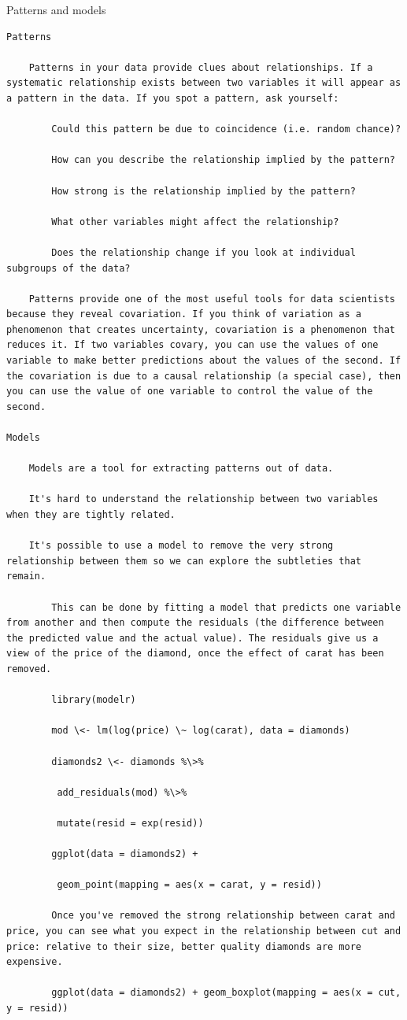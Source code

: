 \documentclass[
]{book}
\begin{document}
Patterns and models

\begin{verbatim}
Patterns

    Patterns in your data provide clues about relationships. If a systematic relationship exists between two variables it will appear as a pattern in the data. If you spot a pattern, ask yourself:

        Could this pattern be due to coincidence (i.e. random chance)?

        How can you describe the relationship implied by the pattern?

        How strong is the relationship implied by the pattern?

        What other variables might affect the relationship?

        Does the relationship change if you look at individual subgroups of the data?

    Patterns provide one of the most useful tools for data scientists because they reveal covariation. If you think of variation as a phenomenon that creates uncertainty, covariation is a phenomenon that reduces it. If two variables covary, you can use the values of one variable to make better predictions about the values of the second. If the covariation is due to a causal relationship (a special case), then you can use the value of one variable to control the value of the second.

Models

    Models are a tool for extracting patterns out of data.

    It's hard to understand the relationship between two variables when they are tightly related.

    It's possible to use a model to remove the very strong relationship between them so we can explore the subtleties that remain.

        This can be done by fitting a model that predicts one variable from another and then compute the residuals (the difference between the predicted value and the actual value). The residuals give us a view of the price of the diamond, once the effect of carat has been removed.

        library(modelr)

        mod \<- lm(log(price) \~ log(carat), data = diamonds)

        diamonds2 \<- diamonds %\>%

         add_residuals(mod) %\>%

         mutate(resid = exp(resid))

        ggplot(data = diamonds2) +

         geom_point(mapping = aes(x = carat, y = resid))

        Once you've removed the strong relationship between carat and price, you can see what you expect in the relationship between cut and price: relative to their size, better quality diamonds are more expensive.

        ggplot(data = diamonds2) + geom_boxplot(mapping = aes(x = cut, y = resid))
\end{verbatim}
\end{document}
